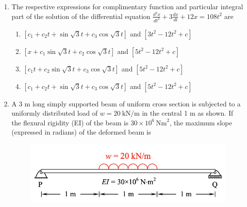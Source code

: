 \documentclass[journal]{IEEEtran}
\begin{document}
\begin{enumerate}[resume]
\begin{enumerate}
\end{enumerate}

\item The respective expressions for complimentary function and particular integral part of the solution of the differential equation $\frac{d^2x}{dt^2} + 3\frac{dx}{dt} + 12x = 108t^2$ are \hfill {}
\begin{enumerate}
\item $[c_1 + c_2 t + \sin \sqrt{3}t + c_3 \cos \sqrt{3}t]$ and $[3t^2 - 12t^2 + c]$
\item $[x + c_1 \sin \sqrt{3}t + c_2 \cos \sqrt{3}t]$ and $[5t^2 - 12t^2 + c]$
\item $[c_1 t + c_2 \sin \sqrt{3}t + c_3 \cos \sqrt{3}t]$ and $[5t^2 - 12t^2 + c]$
\item $[c_1 + c_2 t + \sin \sqrt{3}t + c_3 \cos \sqrt{3}t]$ and $[5t^2 - 12t^2 + c]$
\end{enumerate}

\item A 3 m long simply supported beam of uniform cross section is subjected to a uniformly distributed load of $w = 20 \ \text{kN/m}$ in the central 1 m as shown. If the flexural rigidity (EI) of the beam is $30 \times 10^6 \ \text{Nm}^2$, the maximum slope (expressed in radians) of the deformed beam is \hfill {}

\begin{figure}[H]
    \centering
    \includegraphics[width=0.3\columnwidth]{figs/Q41.png} 
    \caption{}
    \label{fig:placeholder}
\end{figure}

\begin{enumerate}
\end{enumerate}


\end{enumerate}
\end{document}
